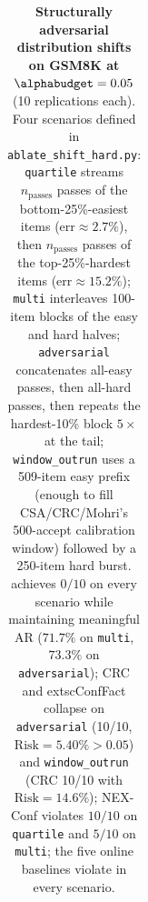 \begin{table}[!ht]
\begin{tabular}{llrrrc}
\bottomrule
\end{tabular}
\caption{\textbf{Structurally adversarial distribution shifts on GSM8K at $\alphabudget=0.05$} (10 replications each). Four scenarios defined in \texttt{ablate\_shift\_hard.py}: \texttt{quartile} streams $n_{\text{passes}}$ passes of the bottom-25\%-easiest items (err$\approx 2.7\%$), then $n_{\text{passes}}$ passes of the top-25\%-hardest items (err$\approx 15.2\%$); \texttt{multi} interleaves 100-item blocks of the easy and hard halves; \texttt{adversarial} concatenates all-easy passes, then all-hard passes, then repeats the hardest-10\% block $5\times$ at the tail; \texttt{window\_outrun} uses a 509-item easy prefix (enough to fill CSA/CRC/Mohri's 500-accept calibration window) followed by a 250-item hard burst. \csa achieves $0/10$ on every scenario while maintaining meaningful AR ($71.7\%$ on \texttt{multi}, $73.3\%$ on \texttt{adversarial}); CRC and 	extsc{ConfFact} collapse on \texttt{adversarial} (10/10, $\text{Risk}=5.40\%>0.05$) and \texttt{window\_outrun} (CRC 10/10 with $\text{Risk}=14.6\%$); NEX-Conf violates $10/10$ on \texttt{quartile} and $5/10$ on \texttt{multi}; the five online baselines violate in every scenario.}
\label{tab:shift-gsm8k-hard}
\end{table}
